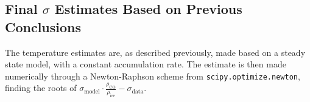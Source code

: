 \documentclass[../../CompleteThesis2/Complete_2ndDraft]{subfiles}
\begin{document}
%		




\subsection[Final $\sigma$ Estimates]{Final $\sigma$ Estimates Based on Previous Conclusions}
\label{Subsec:Results_DiffLenEst_AlphabetCores_FinalEstimates}
The temperature estimates are, as described previously, made based on a steady state model, with a constant accumulation rate. The estimate is then made numerically through a Newton-Raphson scheme from \lstinline[language=Python]|scipy.optimize.newton|, finding the roots of $\sigma_{\text{model}}\cdot \frac{\rho_{\text{CO}}}{\rho_{\text{ice}}} - \sigma_{\text{data}}$.
\end{document}
